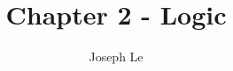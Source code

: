 \documentclass[10pt]{article}
\theoremstyle{definition}
\begin{document}

\title{Chapter 2 - Logic}
\author{Joseph Le}

\maketitle
\end{document}
